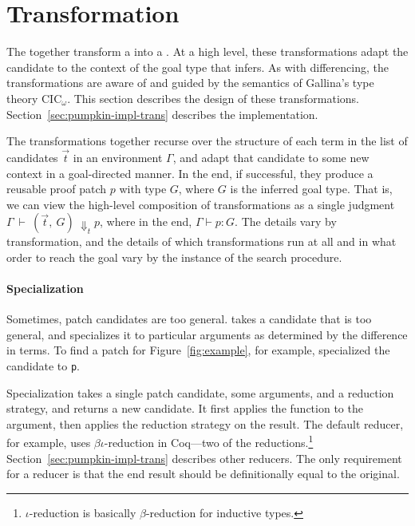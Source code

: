 \section{Transformation}
\label{sec:pumpkin-trans}

The  together transform a  into a .
At a high level, these transformations adapt the candidate to the context of the goal type that \sysname infers.
As with differencing, the transformations are aware of and guided by the semantics of Gallina's type theory CIC$_{\omega}$.
This section describes the design of these transformations.
Section~\ref{sec:pumpkin-impl-trans} describes the implementation.

The transformations together recurse over the structure of each term in the list of candidates $\vec{t}$ in an environment $\Gamma$,
and adapt that candidate to some new context in a goal-directed manner.
In the end, if successful, they produce a reusable proof patch $p$ with type $G$, where $G$ is the inferred goal type.
That is, we can view the high-level composition of transformations as a single judgment
$\Gamma\ \vdash\ (\vec{t},\ G)\ \Downarrow_{t} p$, where in the end, $\Gamma \vdash p : G$. 
The details vary by transformation,
and the details of which transformations run at all and in what order to reach the goal vary by the instance
of the search procedure.


\paragraph{Specialization}
Sometimes, patch candidates are too general.
 takes a candidate that is too general,
and specializes it to particular arguments as determined by the difference in terms.
To find a patch for Figure~\ref{fig:example}, for example, \sysname
specialized the candidate to \lstinline{p}.

Specialization takes a single patch candidate, some arguments, and a reduction strategy, and returns a new candidate.
It first applies the function to the argument, then applies the reduction strategy on the result.
The default reducer, for example, uses $\beta\iota$-reduction in Coq---two of the  reductions.\footnote{$\iota$-reduction is basically $\beta$-reduction for inductive types.}
Section~\ref{sec:pumpkin-impl-trans} describes other reducers.
The only requirement for a reducer is that the end result should be definitionally equal to the original.

